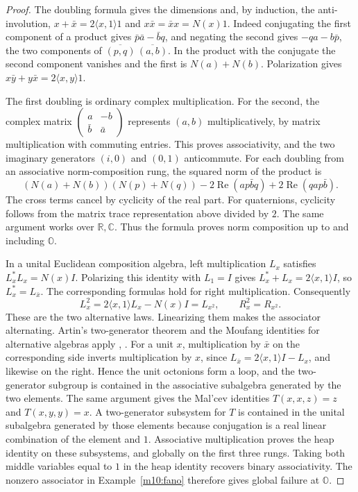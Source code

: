 \documentclass[11pt,reqno]{amsart}
\theoremstyle{definition}
\theoremstyle{remark}
\numberwithin{equation}{section}
\newcommand{\R}{\mathbb{R}}
\newcommand{\C}{\mathbb{C}}
\newcommand{\re}{\operatorname{Re}}
\newcommand{\ip}[2]{\langle #1,#2\rangle}
\begin{document}
\begin{proof}
The doubling formula gives the dimensions and, by induction, the
anti-involution, \(x+\bar x=2\ip{x}{1}1\) and \(x\bar x=\bar x x=N(x)1\).
Indeed conjugating the first component of a product gives
\(\bar p\bar a-\bar b q\), and negating the second gives
\(-qa-b\bar p\), the two components of \(\overline{(p,q)}\,
\overline{(a,b)}\). In the product with the conjugate the second
component vanishes and the first is \(N(a)+N(b)\). Polarization gives
\(x\bar y+y\bar x=2\ip{x}{y}1\).

The first doubling is ordinary complex multiplication. For the second,
the complex matrix
\(\left(\begin{smallmatrix}a&-b\\\bar b&\bar a\end{smallmatrix}\right)\)
represents \((a,b)\) multiplicatively, by matrix multiplication with
commuting entries. This proves associativity, and the two imaginary
generators \((i,0)\) and \((0,1)\) anticommute. For each doubling from an
associative norm-composition rung, the squared norm of the product is
\[
 (N(a)+N(b))(N(p)+N(q))
 -2\re(ap\bar bq)+2\re(qap\bar b).
\]
The cross terms cancel by cyclicity of the real part. For quaternions,
cyclicity follows from the matrix trace representation above divided
by \(2\). The same argument works over \(\R,\C\). Thus the formula proves
norm composition up to and including \(\mathbb O\).

In a unital Euclidean composition algebra, left multiplication \(L_x\)
satisfies \(L_x^*L_x=N(x)I\). Polarizing this identity with \(L_1=I\)
gives \(L_x^*+L_x=2\ip{x}{1}I\), so \(L_x^*=L_{\bar x}\).
The corresponding formulas hold for right multiplication. Consequently
\[
 L_x^2=2\ip{x}{1}L_x-N(x)I=L_{x^2},\qquad
 R_x^2=R_{x^2}.
\]
These are the two alternative laws. Linearizing them makes the
associator alternating. Artin's two-generator theorem and the Moufang
identities for alternative algebras apply
\cite[\S1.1]{Baez02}, \cite{Schafer66}. For a unit \(x\), multiplication by \(\bar x\)
on the corresponding side inverts multiplication by \(x\), since
\(L_{\bar x}=2\ip{x}{1}I-L_x\), and likewise on the right.
Hence the unit octonions form a loop, and the two-generator subgroup
is contained in the associative subalgebra generated by the two
elements. The same argument gives the Mal'cev identities
\(T(x,x,z)=z\) and \(T(x,y,y)=x\). A two-generator subsystem for \(T\)
is contained in the unital subalgebra generated by those elements
because conjugation is a real linear combination of the element and
\(1\). Associative multiplication proves the heap identity on these
subsystems, and globally on the first three rungs. Taking both middle
variables equal to \(1\) in the heap identity recovers binary
associativity. The nonzero associator in
Example~\ref{m10:fano} therefore gives global failure at \(\mathbb O\).


\end{proof}
\end{document}
